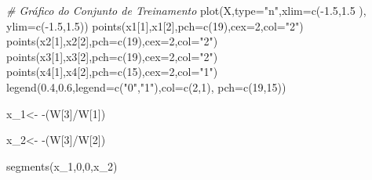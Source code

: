 \documentclass[
]{article}
\newenvironment{Shaded}{\begin{snugshade}}{\end{snugshade}}
\newcommand{\AttributeTok}[1]{\textcolor[rgb]{0.77,0.63,0.00}{#1}}
\newcommand{\CommentTok}[1]{\textcolor[rgb]{0.56,0.35,0.01}{\textit{#1}}}
\newcommand{\DecValTok}[1]{\textcolor[rgb]{0.00,0.00,0.81}{#1}}
\newcommand{\FloatTok}[1]{\textcolor[rgb]{0.00,0.00,0.81}{#1}}
\newcommand{\FunctionTok}[1]{\textcolor[rgb]{0.00,0.00,0.00}{#1}}
\newcommand{\NormalTok}[1]{#1}
\newcommand{\OtherTok}[1]{\textcolor[rgb]{0.56,0.35,0.01}{#1}}
\newcommand{\SpecialCharTok}[1]{\textcolor[rgb]{0.00,0.00,0.00}{#1}}
\newcommand{\StringTok}[1]{\textcolor[rgb]{0.31,0.60,0.02}{#1}}
\begin{document}
\begin{Shaded}
\begin{Highlighting}[]
\CommentTok{\# Gráfico do Conjunto de Treinamento}
\FunctionTok{plot}\NormalTok{(X,}\AttributeTok{type=}\StringTok{"n"}\NormalTok{,}\AttributeTok{xlim=}\FunctionTok{c}\NormalTok{(}\SpecialCharTok{{-}}\FloatTok{1.5}\NormalTok{,}\FloatTok{1.5}\NormalTok{ ), }\AttributeTok{ylim=}\FunctionTok{c}\NormalTok{(}\SpecialCharTok{{-}}\FloatTok{1.5}\NormalTok{,}\FloatTok{1.5}\NormalTok{))}
\FunctionTok{points}\NormalTok{(x1[}\DecValTok{1}\NormalTok{],x1[}\DecValTok{2}\NormalTok{],}\AttributeTok{pch=}\FunctionTok{c}\NormalTok{(}\DecValTok{19}\NormalTok{),}\AttributeTok{cex=}\DecValTok{2}\NormalTok{,}\AttributeTok{col=}\StringTok{"2"}\NormalTok{)}
\FunctionTok{points}\NormalTok{(x2[}\DecValTok{1}\NormalTok{],x2[}\DecValTok{2}\NormalTok{],}\AttributeTok{pch=}\FunctionTok{c}\NormalTok{(}\DecValTok{19}\NormalTok{),}\AttributeTok{cex=}\DecValTok{2}\NormalTok{,}\AttributeTok{col=}\StringTok{"2"}\NormalTok{)}
\FunctionTok{points}\NormalTok{(x3[}\DecValTok{1}\NormalTok{],x3[}\DecValTok{2}\NormalTok{],}\AttributeTok{pch=}\FunctionTok{c}\NormalTok{(}\DecValTok{19}\NormalTok{),}\AttributeTok{cex=}\DecValTok{2}\NormalTok{,}\AttributeTok{col=}\StringTok{"2"}\NormalTok{)}
\FunctionTok{points}\NormalTok{(x4[}\DecValTok{1}\NormalTok{],x4[}\DecValTok{2}\NormalTok{],}\AttributeTok{pch=}\FunctionTok{c}\NormalTok{(}\DecValTok{15}\NormalTok{),}\AttributeTok{cex=}\DecValTok{2}\NormalTok{,}\AttributeTok{col=}\StringTok{"1"}\NormalTok{)}
\FunctionTok{legend}\NormalTok{(}\FloatTok{0.4}\NormalTok{,}\FloatTok{0.6}\NormalTok{,}\AttributeTok{legend=}\FunctionTok{c}\NormalTok{(}\StringTok{"0"}\NormalTok{,}\StringTok{"1"}\NormalTok{),}\AttributeTok{col=}\FunctionTok{c}\NormalTok{(}\DecValTok{2}\NormalTok{,}\DecValTok{1}\NormalTok{), }\AttributeTok{pch=}\FunctionTok{c}\NormalTok{(}\DecValTok{19}\NormalTok{,}\DecValTok{15}\NormalTok{))}

\NormalTok{x\_1}\OtherTok{\textless{}{-}} \SpecialCharTok{{-}}\NormalTok{(W[}\DecValTok{3}\NormalTok{]}\SpecialCharTok{/}\NormalTok{W[}\DecValTok{1}\NormalTok{])}

\NormalTok{x\_2}\OtherTok{\textless{}{-}} \SpecialCharTok{{-}}\NormalTok{(W[}\DecValTok{3}\NormalTok{]}\SpecialCharTok{/}\NormalTok{W[}\DecValTok{2}\NormalTok{])}

\FunctionTok{segments}\NormalTok{(x\_1,}\DecValTok{0}\NormalTok{,}\DecValTok{0}\NormalTok{,x\_2)}
\end{Highlighting}
\end{Shaded}
\end{document}
